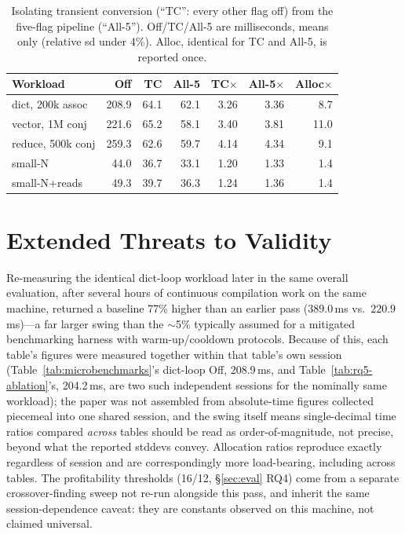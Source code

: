\documentclass[sigplan,review,anonymous]{acmart}
\begin{document}
\begin{table}[h]
  \caption{Isolating transient conversion (``TC'': every other flag off) from the five-flag pipeline (``All-5''). Off/TC/All-5 are milliseconds, means only (relative sd under 4\%). Alloc, identical for TC and All-5, is reported once.}
  \label{tab:tc-ablation}
  \footnotesize
  \setlength{\tabcolsep}{2pt}
  \begin{tabular}{@{}lrrrrrr@{}}
    \toprule
    Workload & Off & TC & All-5 & TC$\times$ & All-5$\times$ & Alloc$\times$ \\
    \midrule
    dict, 200k assoc  & 208.9 & 64.1 & 62.1 & 3.26 & 3.36 & 8.7 \\
    vector, 1M conj    & 221.6 & 65.2 & 58.1 & 3.40 & 3.81 & 11.0 \\
    reduce, 500k conj  & 259.3 & 62.6 & 59.7 & 4.14 & 4.34 & 9.1 \\
    small-N            & 44.0  & 36.7 & 33.1 & 1.20 & 1.33 & 1.4 \\
    small-N+reads      & 49.3  & 39.7 & 36.3 & 1.24 & 1.36 & 1.4 \\
  \bottomrule
\end{tabular}
\end{table}

\section{Extended Threats to Validity}
\label{app:threats}

Re-measuring the identical dict-loop workload later in the same overall evaluation, after several hours of continuous compilation work on the same machine, returned a baseline 77\% higher than an earlier pass ($389.0$\,ms vs.\ $220.9$\,ms)---a far larger swing than the $\sim$5\% typically assumed for a mitigated benchmarking harness with warm-up/cooldown protocols. Because of this, each table's figures were measured together within that table's own session (Table~\ref{tab:microbenchmarks}'s dict-loop Off, 208.9\,ms, and Table~\ref{tab:rq5-ablation}'s, 204.2\,ms, are two such independent sessions for the nominally same workload); the paper was not assembled from absolute-time figures collected piecemeal into one shared session, and the swing itself means single-decimal time ratios compared \emph{across} tables should be read as order-of-magnitude, not precise, beyond what the reported stddevs convey. Allocation ratios reproduce exactly regardless of session and are correspondingly more load-bearing, including across tables. The profitability thresholds (16/12, §\ref{sec:eval} RQ4) come from a separate crossover-finding sweep not re-run alongside this pass, and inherit the same session-dependence caveat: they are constants observed on this machine, not claimed universal.
\end{document}
